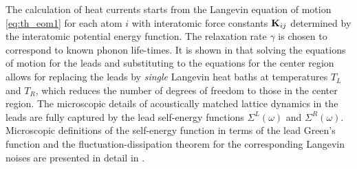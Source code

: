 The calculation of heat currents starts from the Langevin equation of motion \eqref{eq:th_eom1} for each atom $i$ with interatomic force constants $\mathbf{K}_{ij}$ determined by the interatomic potential energy function. The relaxation rate $\gamma$ is chosen to correspond to known phonon life-times. It is shown in  that solving the equations of motion for the leads and substituting to the equations for the center region allows for replacing the leads by \textit{single} Langevin heat baths at temperatures $T_L$ and $T_R$, which reduces the number of degrees of freedom to those in the center region. The microscopic details of acoustically matched lattice dynamics in the leads are fully captured by the lead self-energy functions $\Sigma^L(\omega)$ and $\Sigma^R(\omega)$. Microscopic definitions of the self-energy function in terms of the lead Green's function and the fluctuation-dissipation theorem for the corresponding Langevin noises are presented in detail in .





